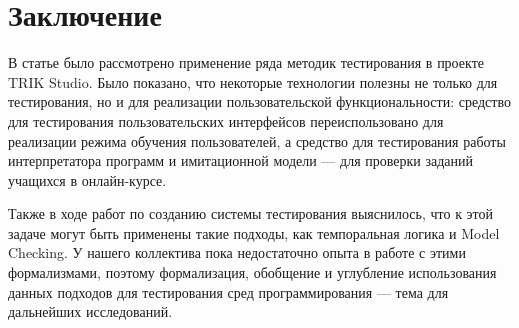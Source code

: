 ﻿\documentclass[conference]{IEEEtran}
\begin{document}
\section{Заключение}
В статье было рассмотрено применение ряда методик тестирования в проекте TRIK Studio. 
Было показано, что некоторые технологии полезны не только для тестирования, но и для 
реализации пользовательской функциональности: средство для тестирования пользовательских 
интерфейсов переиспользовано для реализации режима обучения пользователей, а средство 
для тестирования работы интерпретатора программ и имитационной модели --- для проверки 
заданий учащихся в онлайн-курсе.

Также в ходе работ по созданию системы тестирования выяснилось, что к этой задаче 
могут быть применены такие подходы, как темпоральная логика и Model Checking. У нашего 
коллектива пока недостаточно опыта в работе с этими формализмами, поэтому формализация, 
обобщение и углубление использования данных подходов для тестирования сред программирования 
--- тема для дальнейших исследований.
\end{document}
